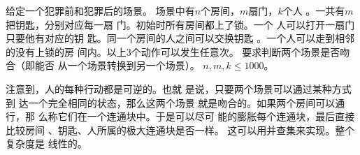 \begin{prob}
	给定一个犯罪前和犯罪后的场景。
	场景中有$n$个房间，$m$扇门，$k$个人
	。一共有$m$把钥匙，分别对应每一扇
	门。初始时所有房间都上了锁。一个
	人可以打开一扇门只要他有对应的钥
	匙。同一个房间的人之间可以交换钥匙
	。一个人可以走到相邻的没有上锁的房
	间内。以上3个动作可以发生任意次。
	要求判断两个场景是否吻合（即能否
	从一个场景转换到另一个场景）。
	$n,m,k \le 1000$。
\end{prob}

\begin{sol}
	注意到，人的每种行动都是可逆的。也就
	是说，只要两个场景可以通过某种方式到
	达一个完全相同的状态，那么这两个场景
	就是吻合的。如果两个房间可以通行，那
	么称它们在一个连通块中。于是可以尽可
	能的膨胀每个连通块，最后直接比较房间
	、钥匙、人所属的极大连通块是否一样。
	这可以用并查集来实现。整个复杂度是
	线性的。
\end{sol}
